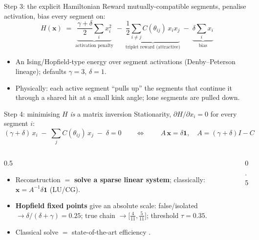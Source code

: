 \begin{frame}{Step 3: the explicit Hamiltonian}
  Reward mutually-compatible segments, penalise activation, bias every segment on:
  \[ \boxed{\;H(\mathbf{x}) \;=\; \underbrace{\frac{\gamma+\delta}{2}\sum_i x_i^2}_{\text{activation penalty}}
      \;-\; \underbrace{\frac12\sum_{i\neq j} C(\theta_{ij})\,x_i x_j}_{\text{triplet reward (attractive)}}
      \;-\; \underbrace{\delta\sum_i x_i}_{\text{bias}}\;} \]
  \begin{itemize}
    \item An Ising/Hopfield-type energy over segment activations (Denby--Peterson lineage); defaults $\gamma{=}3$, $\delta{=}1$.
    \item Physically: each active segment ``pulls up'' the segments that continue it through a shared hit at a small kink angle; lone segments are pulled down.
  \end{itemize}
\end{frame}

\begin{frame}{Step 4: minimising $H$ \emph{is} a matrix inversion}
  Stationarity, $\partial H/\partial x_i = 0$ for every segment $i$:
  \[ (\gamma+\delta)\,x_i \;-\; \sum_{j} C(\theta_{ij})\,x_j \;-\; \delta = 0
     \qquad\Longleftrightarrow\qquad \boxed{\,A\,\mathbf{x}=\delta\mathbf{1},\quad A=(\gamma+\delta)I - C\,} \]
  \begin{columns}[T]
    \begin{column}{0.5\textwidth}
      \begin{itemize}
        \item Reconstruction $=$ \textbf{solve a sparse linear system}; classically: $\mathbf{x}=A^{-1}\delta\mathbf{1}$ (LU/CG).
        \item \textbf{Hopfield fixed points} give an absolute scale:
        false/isolated $\to\delta/(\delta{+}\gamma)=0.25$;\quad
        true chain $\to\big[\tfrac{4}{11},\tfrac{5}{11}\big]$;\quad
        threshold $\tau{=}0.35$.
        \item Classical solve $=$ state-of-the-art efficiency \cn{[arXiv:2511.11458]}.
      \end{itemize}
    \end{column}
    \begin{column}{0.5\textwidth}
      \centering{}
    \end{column}
  \end{columns}
\end{frame}


